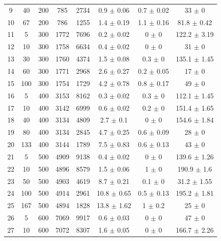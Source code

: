 \documentclass[11pt]{article}
\begin{document}
\begin{table}[]
{\begin{tabular}{cccccccc}
				9 & 40 & 200 & 785 & 2734 & 0.9 $\pm$ 0.06 & 0.7 $\pm$ 0.02 & 33 $\pm$ 0 \\
				10 & 67 & 200 & 786 & 1255 & 1.4 $\pm$ 0.19 & 1.1 $\pm$ 0.16 & 81.8 $\pm$ 0.42 \\
				\rowcolor[HTML]{EFEFEF} 
				11 & 5 & 300 & 1772 & 7696 & 0.2 $\pm$ 0.02 & 0 $\pm$ 0 & 122.2 $\pm$ 3.19 \\
				\rowcolor[HTML]{EFEFEF} 
				12 & 10 & 300 & 1758 & 6634 & 0.4 $\pm$ 0.02 & 0 $\pm$ 0 & 31 $\pm$ 0 \\
				\rowcolor[HTML]{EFEFEF} 
				13 & 30 & 300 & 1760 & 4374 & 1.5 $\pm$ 0.08 & 0.3 $\pm$ 0 & 135.1 $\pm$ 1.45 \\
				\rowcolor[HTML]{EFEFEF} 
				14 & 60 & 300 & 1771 & 2968 & 2.6 $\pm$ 0.27 & 0.2 $\pm$ 0.05 & 17 $\pm$ 0 \\
				\rowcolor[HTML]{EFEFEF} 
				15 & 100 & 300 & 1754 & 1729 & 4.2 $\pm$ 0.78 & 0.8 $\pm$ 0.17 & 49 $\pm$ 0 \\
				16 & 5 & 400 & 3153 & 8162 & 0.3 $\pm$ 0.02 & 0.3 $\pm$ 0 & 112.1 $\pm$ 1.45 \\
				17 & 10 & 400 & 3142 & 6999 & 0.6 $\pm$ 0.02 & 0.2 $\pm$ 0 & 151.4 $\pm$ 1.65 \\
				18 & 40 & 400 & 3134 & 4809 & 2.7 $\pm$ 0.1 & 0 $\pm$ 0 & 154.6 $\pm$ 1.84 \\
				19 & 80 & 400 & 3134 & 2845 & 4.7 $\pm$ 0.25 & 0.6 $\pm$ 0.09 & 28 $\pm$ 0 \\
				20 & 133 & 400 & 3144 & 1789 & 7.5 $\pm$ 0.83 & 0.6 $\pm$ 0.13 & 43 $\pm$ 0 \\
				\rowcolor[HTML]{EFEFEF} 
				21 & 5 & 500 & 4909 & 9138 & 0.4 $\pm$ 0.02 & 0 $\pm$ 0 & 139.6 $\pm$ 1.26 \\
				\rowcolor[HTML]{EFEFEF} 
				22 & 10 & 500 & 4896 & 8579 & 1.5 $\pm$ 0.06 & 1 $\pm$ 0 & 190.9 $\pm$ 1.6 \\
				\rowcolor[HTML]{EFEFEF} 
				23 & 50 & 500 & 4903 & 4619 & 8.7 $\pm$ 0.21 & 0.1 $\pm$ 0 & 31.2 $\pm$ 1.55 \\
				\rowcolor[HTML]{EFEFEF} 
				24 & 100 & 500 & 4914 & 2961 & 10.8 $\pm$ 0.65 & 0.5 $\pm$ 0.13 & 195.2 $\pm$ 1.81 \\
				\rowcolor[HTML]{EFEFEF} 
				25 & 167 & 500 & 4894 & 1828 & 13.8 $\pm$ 1.62 & 1 $\pm$ 0.2 & 25 $\pm$ 0 \\
				26 & 5 & 600 & 7069 & 9917 & 0.6 $\pm$ 0.03 & 0 $\pm$ 0 & 47 $\pm$ 0 \\
				27 & 10 & 600 & 7072 & 8307 & 1.6 $\pm$ 0.05 & 0 $\pm$ 0 & 166.7 $\pm$ 2.26 \\

\end{tabular}}
\end{table}
\end{document}
